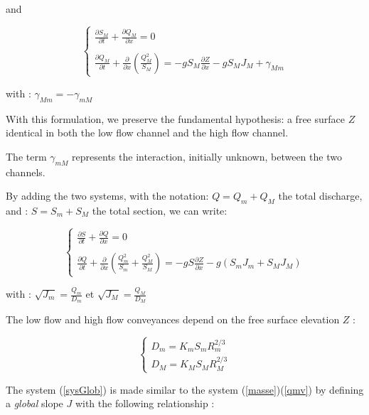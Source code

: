 and

\begin{equation}
 \left \lbrace
  \begin{array}{l}
    \frac{\partial{S_M}}{\partial{t}} + \frac{\partial{Q_M}}{\partial{x}} = 0 \\
    \\
    \frac{\partial{Q_M}}{\partial{t}} + \frac{\partial}{\partial{x}} \left ( \frac{Q_{M}^2}{S_M} \right ) = -g S_M \frac{\partial{Z}}{\partial{x}} - g S_M J_M + \gamma_{Mm}
  \end{array}
 \right.
\end{equation}

with : $\gamma_{Mm} = -\gamma_{mM}$

With this formulation, we preserve the fundamental hypothesis: a free surface $Z$ identical in both the low flow channel and the high flow channel.

The term $\gamma_{mM}$ represents the interaction, initially unknown, between the two channels.

By adding the two systems, with the notation: $Q = Q_m + Q_M$ the total discharge, and : $S = S_m + S_M$ the total section, we can write:

\begin{equation}
 \label{sysGlob}
 \left \lbrace
  \begin{array}{l}
    \frac{\partial{S}}{\partial{t}} + \frac{\partial{Q}}{\partial{x}} = 0 \\
    \\
    \frac{\partial{Q}}{\partial{t}} + \frac{\partial}{\partial{x}} \left ( \frac{Q_{m}^2}{S_m} + \frac{Q_{M}^2}{S_M} \right ) = -g S \frac{\partial{Z}}{\partial{x}} - g ( S_m J_m + S_M J_M )
  \end{array}
 \right.
\end{equation}

with : $\sqrt{J_m} = \frac{Q_m}{D_m}$ et  $\sqrt{J_M} = \frac{Q_M}{D_M}$

The low flow and high flow conveyances depend on the free surface elevation $Z$ :

\begin{equation}
 \left \lbrace
  \begin{array}{l}
    D_m = K_m S_m R_{m}^{2/3} \\
    D_M = K_M S_M R_{M}^{2/3}
  \end{array}
 \right.
\end{equation}

The system (\ref{sysGlob}) is made similar to the system (\ref{masse})(\ref{qmv}) by defining a \textit{global} slope $J$ with the following relationship :

